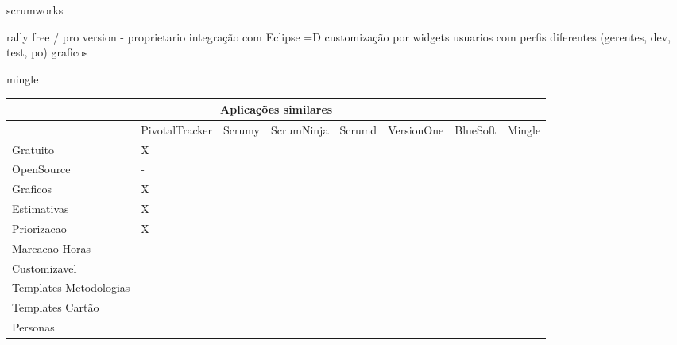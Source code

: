 scrumworks

rally
	free / pro version - proprietario
	integração com Eclipse =D
	customização por widgets
	usuarios com perfis diferentes (gerentes, dev, test, po)
	graficos

mingle

\begin{sidewaystable}
	\begin{tabular}{|l|l|l|l|l|l|l|l}
		\hline
		\multicolumn{8}{|c|}{Aplicações similares} \\
		\hline
		 & PivotalTracker & Scrumy & ScrumNinja & Scrumd & VersionOne & BlueSoft & Mingle \\
		Gratuito & X & & & & & & \\
		OpenSource & - & & & & & & \\
		Graficos & X & & & & & & \\
		Estimativas & X & & & & & & \\
		Priorizacao & X & & & & & & \\
		Marcacao Horas & - & & & & & & \\
		Customizavel & & & & & & & \\
		Templates Metodologias & & & & & & & \\
		Templates Cartão & & & & & & & \\
		Personas & & & & & & & \\
		\hline
	\end{tabular}
\end{sidewaystable}


